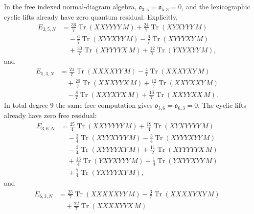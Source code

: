 \begin{prop}
\label{prop:app-free-obstruction-certificates}
  In the free indexed normal-diagram algebra,
  \(\mathfrak o_{3,5}=\mathfrak o_{5,3}=0\), and the lexicographic
  cyclic lifts already have zero quantum residual.  Explicitly,
  \[
  \begin{aligned}
    E_{3,5,N}
    &=
      \frac{36}{7}\operatorname{Tr}(XXYYYY\,M)
      +\frac{24}{7}\operatorname{Tr}(XYXYYY\,M)\\
    &\quad
      -\frac{6}{7}\operatorname{Tr}(XYYXYY\,M)
      -\frac{6}{7}\operatorname{Tr}(XYYYXY\,M)\\
    &\quad
      +\frac{30}{7}\operatorname{Tr}(XYYYYX\,M)
      +\frac{12}{7}\operatorname{Tr}(YXYXYY\,M),
  \end{aligned}
  \]
  and
  \[
  \begin{aligned}
    E_{5,3,N}
    &=
      \frac{24}{7}\operatorname{Tr}(XXXXYY\,M)
      -\frac{4}{7}\operatorname{Tr}(XXXYXY\,M)\\
    &\quad
      +\frac{20}{7}\operatorname{Tr}(XXXYYX\,M)
      +\frac{12}{7}\operatorname{Tr}(XXYXXY\,M)\\
    &\quad
      -\frac{8}{7}\operatorname{Tr}(XXYXYX\,M)
      +\frac{16}{7}\operatorname{Tr}(XXYYXX\,M).
  \end{aligned}
  \]
  In total degree \(9\) the same free computation gives
  \(\mathfrak o_{3,6}=\mathfrak o_{6,3}=0\).  The cyclic lifts already
  have zero free residual:
  \[
  \begin{aligned}
    E_{3,6,N}
    &=
      \frac{25}{4}\operatorname{Tr}(XXYYYYY\,M)
      +\frac{19}{4}\operatorname{Tr}(XYXYYYY\,M)\\
    &\quad
      -\frac{3}{4}\operatorname{Tr}(XYYXYYY\,M)
      -\frac{3}{4}\operatorname{Tr}(XYYYXYY\,M)\\
    &\quad
      -\frac{3}{4}\operatorname{Tr}(XYYYYXY\,M)
      +\frac{11}{2}\operatorname{Tr}(XYYYYYX\,M)\\
    &\quad
      +\frac{13}{4}\operatorname{Tr}(YXYXYYY\,M)
      +\frac{1}{4}\operatorname{Tr}(YXYYXYY\,M)\\
    &\quad
      +\frac{7}{4}\operatorname{Tr}(YXYYYXY\,M),
  \end{aligned}
  \]
  and
  \[
  \begin{aligned}
    E_{6,3,N}
    &=
      \frac{25}{7}\operatorname{Tr}(XXXXXYY\,M)
      -\frac{3}{7}\operatorname{Tr}(XXXXYXY\,M)\\
    &\quad
      +\frac{22}{7}\operatorname{Tr}(XXXXYYX\,M)

\end{aligned}\]
\end{prop}
